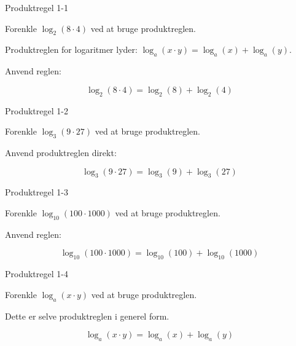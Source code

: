 \documentclass{article}
\begin{document}

\tableofcontents
\newpage

\begin{exercise}{Produktregel 1-1}

Forenkle $\log_2(8 \cdot 4)$ ved at bruge produktreglen.


\hint

Produktreglen for logaritmer lyder: $\log_a(x \cdot y) = \log_a(x) + \log_a(y)$.

\hint

Anvend reglen:

\hint
\[
\log_2(8 \cdot 4) = \log_2(8) + \log_2(4)
\]

\end{exercise}

\newpage

\begin{exercise}{Produktregel 1-2}

Forenkle $\log_3(9 \cdot 27)$ ved at bruge produktreglen.


\hint

Anvend produktreglen direkt:

\hint
\[
\log_3(9 \cdot 27) = \log_3(9) + \log_3(27)
\]

\end{exercise}

\newpage

\begin{exercise}{Produktregel 1-3}

Forenkle $\log_{10}(100 \cdot 1000)$ ved at bruge produktreglen.


\hint

Anvend reglen:

\hint
\[
\log_{10}(100 \cdot 1000) = \log_{10}(100) + \log_{10}(1000)
\]

\end{exercise}

\newpage

\begin{exercise}{Produktregel 1-4}

Forenkle $\log_a(x \cdot y)$ ved at bruge produktreglen.


\hint

Dette er selve produktreglen i generel form.

\hint
\[
\log_a(x \cdot y) = \log_a(x) + \log_a(y)
\]

\end{exercise}
\end{document}
